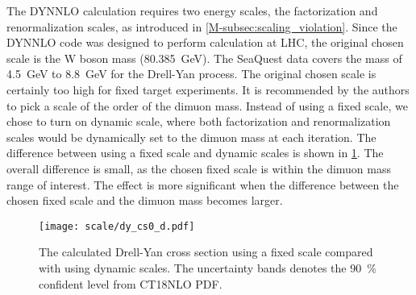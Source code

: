 \documentclass[../main.tex]{subfiles}
\begin{document}
The DYNNLO calculation requires two energy scales, the factorization and renormalization scales,
as introduced in \cref{M-subsec:scaling_violation}. Since the DYNNLO code was designed to perform
calculation at LHC, the original chosen scale is the W boson mass (\SI{80.385}{\GeV}).
The SeaQuest data covers the mass of \SI{4.5}{\GeV} to \SI{8.8}{\GeV} for the Drell-Yan
process. The original chosen scale is certainly too high for fixed target experiments.
It is recommended by the authors to pick a scale of the order of the dimuon mass.
Instead of using a fixed scale, we chose to turn on dynamic scale,
where both factorization and renormalization scales would be dynamically set to the dimuon mass at
each iteration.  The difference between using a fixed scale and dynamic scales is shown in \cref{fig:DY_scale}.
The overall difference is small, as the chosen fixed scale is within the dimuon mass range of interest.
The effect is more significant when the difference between the chosen fixed scale and the dimuon mass
becomes larger.
\begin{figure}[h!]
	\centering
	\texttt{[image: scale/dy\_cs0\_d.pdf]}
	\caption{The calculated Drell-Yan cross section using a fixed scale compared with using dynamic scales.
		The uncertainty bands denotes the \SI{90}{\percent} confident level from CT18NLO PDF.
	}
	\label{fig:DY_scale}
\end{figure}




\ifSubfilesClassLoaded{ \printbibliography[heading=bibintoc,title={References}]}{}
\end{document}
